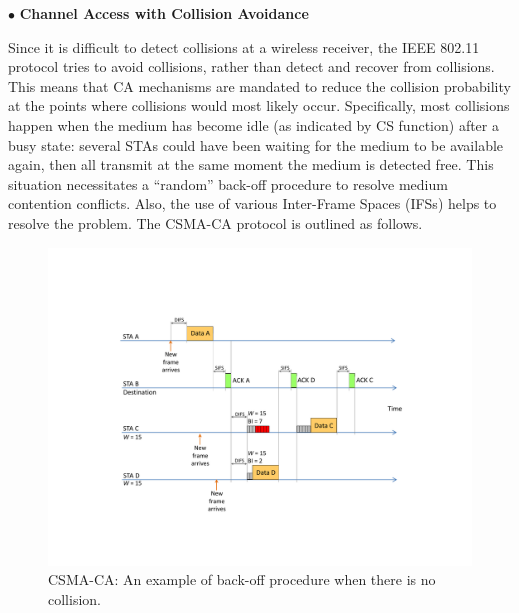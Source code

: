 \documentclass[journal,draftclsnofoot,12pt,onecolumn]{IEEEtran}
\begin{document}
\vspace{3mm}
\noindent $\bullet$ \textbf{Channel Access with Collision Avoidance}
\vspace{3mm}

\noindent Since it is difficult to detect collisions at a wireless receiver, the IEEE 802.11 protocol tries to avoid collisions, rather than detect and recover from collisions. This means that CA mechanisms are mandated to reduce the collision probability at the points where collisions would most likely occur. Specifically, most collisions happen when the medium has become idle (as indicated by CS function) after a busy state: several STAs could have been waiting for the medium to be available again, then all transmit at the same moment the medium is detected free. This situation necessitates a ``random'' back-off procedure to resolve medium contention conflicts. Also, the use of various Inter-Frame Spaces (IFSs) helps to resolve the problem. The CSMA-CA protocol is outlined as follows.

\begin{figure}[!t]
\centering
\includegraphics[width=0.9\columnwidth]{figures2/CSMA-CA-back-off-no-collision}
\caption{CSMA-CA: An example of back-off procedure when there is no collision.}
\label{figs:CSMA-CA-back-off-no-collision}
\end{figure}
\end{document}

